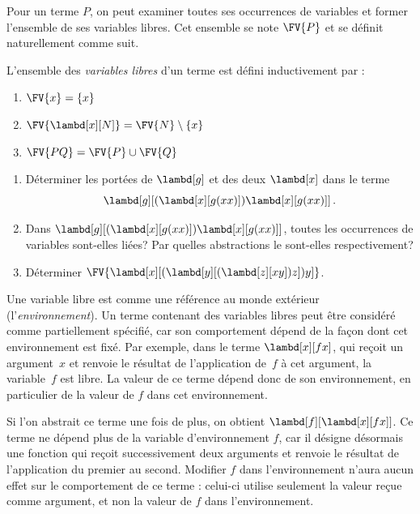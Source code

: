 \documentclass[../../../include/open-logic-section]{subfiles}
\begin{document}
Pour un terme $P$, on peut examiner toutes
ses occurrences de variables et former
l'ensemble de ses variables libres. Cet
ensemble se note $\FV{P}$ et se définit
naturellement comme suit.

\begin{defn} 
L'ensemble des \emph{variables libres} d'un
terme est défini inductivement par :
\begin{enumerate}
  \item $\FV{x} = \{x\}$ 
  \item $\FV{\lambd[x][N]} = \FV{N} \setminus \{x\}$ 
  \item $\FV{PQ} = \FV{P} \cup \FV{Q}$ 
\end{enumerate}
\end{defn}

\begin{prob}
\begin{enumerate}
\item Déterminer les portées de $\lambd[g]$
  et des deux $\lambd[x]$ dans le terme
  \[
    \lambd[g][(\lambd[x][g (x x)]) \lambd[x][g (x x)]]\,.
  \]
\item Dans $\lambd[g][(\lambd[x][g (x x)]) \lambd[x][g (x x)]]$,
  toutes les occurrences de variables sont-elles
  liées? Par quelles abstractions le sont-elles
  respectivement?
\item Déterminer
  $\FV{\lambd[x][(\lambd[y][(\lambd[z][x y]) z]) y]}$.
\end{enumerate}
\end{prob}

\begin{explain}
Une variable libre est comme une référence au
monde extérieur (l'\emph{environnement}). Un
terme contenant des variables libres peut être
considéré comme partiellement spécifié, car son
comportement dépend de la façon dont cet
environnement est fixé. Par exemple, dans le
terme $\lambd[x][f x]$, qui reçoit un
argument~$x$ et renvoie le résultat de
l'application de~$f$ à cet argument, la
variable~$f$ est libre. La valeur de ce terme
dépend donc de son environnement, en particulier
de la valeur de $f$ dans cet environnement.

Si l'on abstrait ce terme une fois de plus,
on obtient $\lambd[f][\lambd[x][f x]]$.
Ce terme ne dépend plus de la variable
d'environnement $f$, car il désigne désormais
une fonction qui reçoit successivement deux
arguments et renvoie le résultat de
l'application du premier au second. Modifier
$f$ dans l'environnement n'aura aucun effet
sur le comportement de ce terme : celui-ci
utilise seulement la valeur reçue comme argument,
et non la valeur de $f$ dans l'environnement.
\end{explain}
\end{document}
